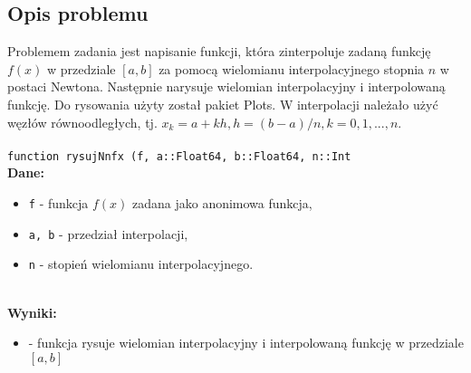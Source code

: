 \documentclass{article}
\begin{document}
\subsection{Opis problemu}
Problemem zadania jest napisanie funkcji, która zinterpoluje zadaną funkcję $f(x)$ w przedziale $[a, b]$ za pomocą wielomianu interpolacyjnego stopnia $n$ w postaci Newtona. Następnie narysuje wielomian interpolacyjny i interpolowaną funkcję. Do rysowania użyty został pakiet Plots. W interpolacji należało użyć węzłów równoodległych, tj. $x_k = a + kh, h = (b − a)/n, k = 0, 1, ... , n$.
\\ \\ \texttt{function rysujNnfx (f, a::Float64, b::Float64, n::Int}
\\ \textbf{Dane:}
\begin{itemize}[label={}]
    \item \texttt{f} - funkcja $f(x)$ zadana jako anonimowa funkcja,
    \item \texttt{a, b} - przedział interpolacji,
    \item \texttt{n} - stopień wielomianu interpolacyjnego.
    \end{itemize}

\\ \textbf{Wyniki:}
\begin{itemize}[label={}]
    \item - funkcja rysuje wielomian interpolacyjny i interpolowaną funkcję w przedziale $[a, b]$
    \end{itemize}
\end{document}
